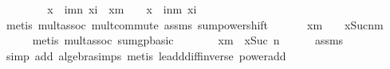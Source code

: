 \begin{isabellebody}
%
\isadelimproof
%
\endisadelimproof
%
\isatagproof
{}\isamarkupfalse%
\ {\isacharminus}{\kern0pt}\isanewline
\ \ \isamarkupfalse%
\ \ {\isachardoublequoteopen}{\isacharparenleft}{\kern0pt}{}\ {\isacharminus}{\kern0pt}\ x{\isacharparenright}{\kern0pt}\ {\isacharasterisk}{\kern0pt}\ {\isacharparenleft}{\kern0pt}{\isasymSum}i{\isacharequal}{\kern0pt}m{\isachardot}{\kern0pt}{\isachardot}{\kern0pt}n{\isachardot}{\kern0pt}\ x{\isacharcircum}{\kern0pt}i{\isacharparenright}{\kern0pt}\ {\isacharequal}{\kern0pt}\ x{\isacharcircum}{\kern0pt}m\ {\isacharasterisk}{\kern0pt}\ {\isacharparenleft}{\kern0pt}{}\ {\isacharminus}{\kern0pt}\ x{\isacharparenright}{\kern0pt}\ {\isacharasterisk}{\kern0pt}\ {\isacharparenleft}{\kern0pt}{\isasymSum}i{\isasymle}n{\isacharminus}{\kern0pt}m{\isachardot}{\kern0pt}\ x{\isacharcircum}{\kern0pt}i{\isacharparenright}{\kern0pt}{\isachardoublequoteclose}\isanewline
\ \ \ \ \isamarkupfalse%
\ {\isacharparenleft}{\kern0pt}metis\ mult{\isachardot}{\kern0pt}assoc\ mult{\isachardot}{\kern0pt}commute\ assms\ sum{\isacharunderscore}{\kern0pt}power{\isacharunderscore}{\kern0pt}shift{\isacharparenright}{\kern0pt}\isanewline
\ \ \isamarkupfalse%
\ \isamarkupfalse%
\ {\isachardoublequoteopen}{\isachardot}{\kern0pt}{\isachardot}{\kern0pt}{\isachardot}{\kern0pt}\ {\isacharequal}{\kern0pt}x{\isacharcircum}{\kern0pt}m\ {\isacharasterisk}{\kern0pt}\ {\isacharparenleft}{\kern0pt}{}\ {\isacharminus}{\kern0pt}\ x{\isacharcircum}{\kern0pt}Suc{\isacharparenleft}{\kern0pt}n{\isacharminus}{\kern0pt}m{\isacharparenright}{\kern0pt}{\isacharparenright}{\kern0pt}{\isachardoublequoteclose}\isanewline
\ \ \ \ \isamarkupfalse%
\ {\isacharparenleft}{\kern0pt}metis\ mult{\isachardot}{\kern0pt}assoc\ sum{\isacharunderscore}{\kern0pt}gp{\isacharunderscore}{\kern0pt}basic{\isacharparenright}{\kern0pt}\isanewline
\ \ \isamarkupfalse%
\ \isamarkupfalse%
\ {\isachardoublequoteopen}{\isachardot}{\kern0pt}{\isachardot}{\kern0pt}{\isachardot}{\kern0pt}\ {\isacharequal}{\kern0pt}\ x{\isacharcircum}{\kern0pt}m\ {\isacharminus}{\kern0pt}\ x{\isacharcircum}{\kern0pt}Suc\ n{\isachardoublequoteclose}\isanewline
\ \ \ \ \isamarkupfalse%
\ assms\isanewline
\ \ \ \ \isamarkupfalse%
\ {\isacharparenleft}{\kern0pt}simp\ add{\isacharcolon}{\kern0pt}\ algebra{\isacharunderscore}{\kern0pt}simps{\isacharparenright}{\kern0pt}\ {\isacharparenleft}{\kern0pt}metis\ le{\isacharunderscore}{\kern0pt}add{\isacharunderscore}{\kern0pt}diff{\isacharunderscore}{\kern0pt}inverse\ power{\isacharunderscore}{\kern0pt}add{\isacharparenright}{\kern0pt}\isanewline

\end{isabellebody}
